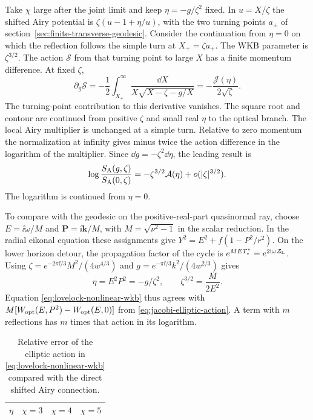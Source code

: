 Take \(\chi\) large after the joint limit and keep
\(\eta=-g/\zeta^2\) fixed. In \(u=X/\zeta\) the shifted
Airy potential is \(\zeta(u-1+\eta/u)\), with the two turning
points \(a_\pm\) of section~\ref{sec:finite-transverse-geodesic}.
Consider the continuation from \(\eta=0\) on which the reflection
follows the simple turn at \(X_+=\zeta a_+\).
The WKB parameter is \(\zeta^{3/2}\).
The action \(\mathcal S\) from that turning point to large \(X\)
has a finite momentum difference. At fixed \(\zeta\),
\begin{equation}
 \partial_g\mathcal S
 =-\frac12\int_{X_+}^\infty
      \frac{\dd X}{X\sqrt{X-\zeta-g/X}}
 =-\frac{\mathcal J(\eta)}{2\sqrt\zeta}.
 \label{eq:lovelock-displaced-action}
\end{equation}
The turning-point contribution to this derivative vanishes.
The square root and contour are continued from positive \(\zeta\)
and small real \(\eta\) to the optical branch. The local Airy
multiplier is unchanged at a simple turn. Relative to zero
momentum the normalization at infinity gives minus twice
the action difference in the logarithm of the multiplier.
Since \(\dd g=-\zeta^2\dd\eta\), the leading result is
\begin{equation}
 \log\frac{S_{\rm A}(g,\zeta)}{S_{\rm A}(0,\zeta)}
 =-\zeta^{3/2}\mathcal A(\eta)+o(|\zeta|^{3/2}).
 \label{eq:lovelock-nonlinear-wkb}
\end{equation}
The logarithm is continued from \(\eta=0\).

To compare with the geodesic on the positive-real-part
quasinormal ray, choose \(E=\ii\omega/M\) and
\(\boldsymbol P=\ii\boldsymbol k/M\), with
\(M=\sqrt{\nu^2-1}\) in the scalar reduction. In the radial
eikonal equation these assignments give \(Y^2=E^2+f(1-P^2/r^2)\).
On the lower horizon detour, the propagation factor of the
cycle is \(e^{ME T_*^*}=e^{2\mathrm{i}\omega\mathcal Z_{\rm L}}\).
Using
\(\zeta=e^{-2\pi\ii/3}M^2/(4w^{4/3})\) and
\(g=e^{-\pi\ii/3}k^2/(4w^{2/3})\) gives
\begin{equation}
 \eta=E^2P^2=-g/\zeta^2,\qquad
 \zeta^{3/2}=\frac{M}{2E^2}.
\end{equation}
Equation \eqref{eq:lovelock-nonlinear-wkb} thus agrees with
\(M[W_{\rm opt}(E,P^2)-W_{\rm opt}(E,0)]\) from
\eqref{eq:jacobi-elliptic-action}. A term with \(m\) reflections
has \(m\) times that action in its logarithm.

\begin{table}[t]
 \centering\small
 \begin{tabular}{cccc}
 \hline
 \(\eta\) & \(\chi=3\) & \(\chi=4\) & \(\chi=5\) \\
 \hline
 
 \end{tabular}
 \caption{Relative error of the elliptic action
 in \eqref{eq:lovelock-nonlinear-wkb} compared with the direct
 shifted Airy connection.}
 \label{tab:lovelock-geometric-momentum}
\end{table}

